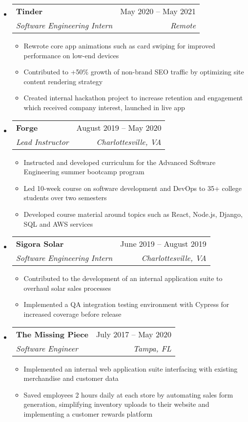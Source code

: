 \documentclass[letterpaper,12pt]{article}[leftmargin=*]
\makeatletter
\def \entryspacing {-0pt}
\newcommand{\resumeEntryStart}{\begin{itemize}[leftmargin=2.5mm]}
\newcommand{\resumeEntryEnd}{\end{itemize}\vspace{\entryspacing}}
\newcommand{\resumeItemListStart}{\begin{itemize}[leftmargin=4.5mm]}
\newcommand{\resumeItemListEnd}{\end{itemize}}
\newcommand{\resumeItem}[1]{
  \item\small{
    {#1 \vspace{-2pt}}
  }
}
\newcommand{\resumeEntryTSDL}[4]{
  \vspace{-1pt}\item[]
    \begin{tabular*}{0.97\textwidth}{l@{\extracolsep{\fill}}r}
      \textbf{\color{primary}#1} & {\firabook\color{accent}\small#2} \\
      \textit{\color{accent}\small#3} & \textit{\color{accent}\small#4} \\
    \end{tabular*}\vspace{-7pt}
}
\makeatother
\begin{document}
\resumeEntryStart
\resumeEntryTSDL
{Tinder}
{May 2020 -- May 2021}
{Software Engineering Intern}
{Remote}
\resumeItemListStart
\resumeItem {Rewrote core app animations such as card swiping for improved performance on low-end devices}
\resumeItem {Contributed to +50\% growth of non-brand SEO traffic by optimizing site content rendering strategy}
\resumeItem {Created internal hackathon project to increase retention and engagement which received company interest, launched in live app}
\resumeItemListEnd
\resumeEntryEnd

\resumeEntryStart
\resumeEntryTSDL
{Forge}
{August 2019 -- May 2020}
{Lead Instructor}
{Charlottesville, VA}
\resumeItemListStart
\resumeItem {Instructed and developed curriculum for the Advanced Software Engineering summer bootcamp program}
\resumeItem {Led 10-week course on software development and DevOps to 35+ college students over two semesters}
\resumeItem {Developed course material around topics such as React, Node.js, Django, SQL and AWS services}
\resumeItemListEnd
\resumeEntryEnd

\resumeEntryStart
\resumeEntryTSDL
{Sigora Solar}
{June 2019 -- August 2019}
{Software Engineering Intern}
{Charlottesville, VA}
\resumeItemListStart
\resumeItem {Contributed to the development of an internal application suite to overhaul solar sales processes}
\resumeItem {Implemented a QA integration testing environment with Cypress for increased coverage before release}
\resumeItemListEnd
\resumeEntryEnd

\resumeEntryStart
\resumeEntryTSDL
{The Missing Piece}
{July 2017 -- May 2020}
{Software Engineer}
{Tampa, FL}
\resumeItemListStart
\resumeItem {Implemented an internal web application suite interfacing with existing merchandise and customer data}
\resumeItem {Saved employees 2 hours daily at each store by automating sales form generation, simplifying inventory uploads to their website and implementing a customer rewards platform}
\resumeItemListEnd
\resumeEntryEnd
\end{document}
